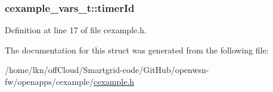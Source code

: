 \subsubsection[{\texorpdfstring{timer\+Id}{timerId}}]{ cexample\+\_\+vars\+\_\+t\+::timer\+Id}\hypertarget{structcexample__vars__t_a7ad3f1e01ae0cb1eb5ff7379f7aad925}{}\label{structcexample__vars__t_a7ad3f1e01ae0cb1eb5ff7379f7aad925}


Definition at line 17 of file cexample.\+h.



The documentation for this struct was generated from the following file\+:\begin{DoxyCompactItemize}
\item 
/home/lkn/off\+Cloud/\+Smartgrid-\/code/\+Git\+Hub/openwsn-\/fw/openapps/cexample/\hyperlink{cexample_8h}{cexample.\+h}\end{DoxyCompactItemize}
